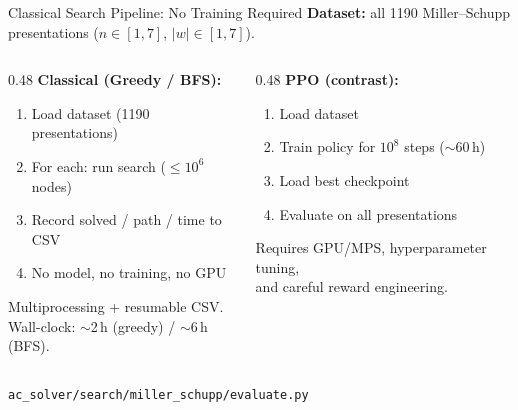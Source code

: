 \documentclass[aspectratio=169,11pt]{beamer}
\begin{document}
\begin{frame}{Classical Search Pipeline: No Training Required}
  \textbf{Dataset:} all 1190 Miller--Schupp presentations ($n \in [1,7]$, $|w| \in [1,7]$).

  \bigskip
  \begin{columns}[T]
    \begin{column}{0.48\textwidth}
      \textbf{Classical (Greedy / BFS):}
      \begin{enumerate}
        \item Load dataset (1190 presentations)
        \item For each: run search ($\le 10^6$ nodes)
        \item Record solved / path / time to CSV
        \item \textcolor{good}{No model, no training, no GPU}
      \end{enumerate}
      \smallskip
      {\footnotesize Multiprocessing + resumable CSV.\\
      Wall-clock: $\sim$2\,h (greedy) / $\sim$6\,h (BFS).}
    \end{column}
    \begin{column}{0.48\textwidth}
      \textbf{PPO (contrast):}
      \begin{enumerate}
        \item Load dataset
        \item \alert{Train policy for $10^8$ steps ($\sim$60\,h)}
        \item Load best checkpoint
        \item Evaluate on all presentations
      \end{enumerate}
      \smallskip
      {\footnotesize Requires GPU/MPS, hyperparameter tuning,\\
      and careful reward engineering.}
    \end{column}
  \end{columns}

  \bigskip
  \footnotesize\texttt{ac\_solver/search/miller\_schupp/evaluate.py}
\end{frame}
\end{document}
